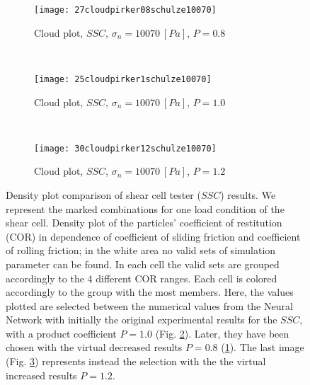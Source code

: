 \begin{figure}[htp] \centering

    \begin{subfigure}[b]{0.96\columnwidth}
        \texttt{[image: 27cloudpirker08schulze10070]}
        \caption{Cloud plot, $SSC$, $\sigma_n=10070 ~[Pa]$, $P=0.8$}
        \label{fig:27cloudpirker08schulze10070} 
    \end{subfigure}\\
    \begin{subfigure}[b]{0.96\columnwidth}
        \texttt{[image: 25cloudpirker1schulze10070]}
        \caption{Cloud plot, $SSC$, $\sigma_n=10070 ~[Pa]$, $P=1.0$}
        \label{fig:25cloudpirker1schulze10070}
    \end{subfigure}\\

    \begin{subfigure}[b]{0.96\columnwidth}
        \texttt{[image: 30cloudpirker12schulze10070]}
        \caption{Cloud plot, $SSC$, $\sigma_n=10070 ~[Pa]$, $P=1.2$}
        \label{fig:30cloudpirker12schulze10070} 
    \end{subfigure}
    \caption[Density plot comparison of SCT results]{Density plot comparison of
    shear cell tester ($SSC$) results. We represent the marked combinations for
    one load condition of the shear cell. 
    Density plot of the particles' coefficient of restitution (COR) in dependence
	of coefficient of sliding friction and coefficient of rolling friction; in the
	white area no valid sets of simulation parameter can be found.
	In each cell the valid sets are grouped accordingly to the 4 different COR
	ranges.
	Each cell is colored accordingly to the group with the most members. 
    Here, the values plotted are selected between the numerical
    values from the Neural Network with initially the original experimental
    results for the $SSC$, with a product coefficient $P=1.0$ (Fig.
    \ref{fig:25cloudpirker1schulze10070}). 
        Later, they have been chosen with  
    the virtual decreased results $P=0.8$
    (\ref{fig:27cloudpirker08schulze10070}).
    The last image (Fig. \ref{fig:30cloudpirker12schulze10070}) represents
    instead the selection with the the virtual increased results $P=1.2$.    }
    \label{fig:29schulzeradarandcloud}
\end{figure}